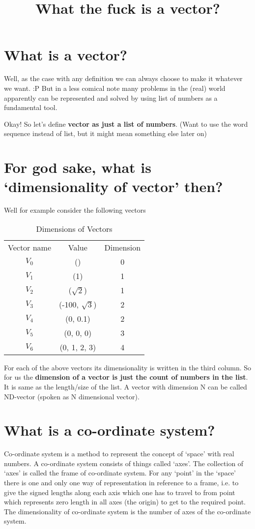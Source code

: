 \documentclass[12pt]{article}
\title{What the fuck is a vector?}
\author{}
\begin{document}
\maketitle

\section{What is a vector?}
Well, as the case with any definition we can always choose to make it whatever we want. :P
But in a less comical note many problems in the (real) world apparently can be represented and solved by using list of numbers as a fundamental tool.

Okay! So let's define \textbf{vector as just a list of numbers}. (Want to use the word sequence instead of list, but it might mean something else later on)

\section{For god sake, what is `dimensionality of vector' then?}
Well for example consider the following vectors

\begin{table}[h]
  \centering
  \begin{tabular}{ c  c  c }
    Vector name & Value & Dimension\\
    $ V_0 $ & () & 0\\
    $ V_1 $ & (1) & 1\\
    $ V_2 $ & ($\sqrt{2}$) & 1\\
    $ V_3 $ & (-100, $\sqrt{3}$) & 2\\
    $ V_4 $ & (0, 0.1) & 2\\
    $ V_5 $ & (0, 0, 0) & 3\\
    $ V_6 $ & (0, 1, 2, 3) & 4\\
  \end{tabular}
\caption{Dimensions of Vectors}
\label{tab:dim}
\end{table}

For each of the above vectors its dimensionality is written in the third column.
So for us the \textbf{dimension of a vector is just the count of numbers in the list}.
It is same as the length/size of the list. A vector with dimension N can be called ND-vector (spoken as N dimensional vector).

\section{What is a co-ordinate system?}
Co-ordinate system is a method to represent the concept of `space' with real numbers.
A co-ordinate system consists of things called `axes'. The collection of `axes' is called the frame of co-ordinate system.
For any `point' in the `space' there is one and only one way of representation in reference to a frame, i.e. to give the signed lengths along each axis which one has to travel to from point which represents zero length in all axes (the origin) to get to the required point. The dimensionality of co-ordinate system is the number of axes of the co-ordinate system.
\end{document}
